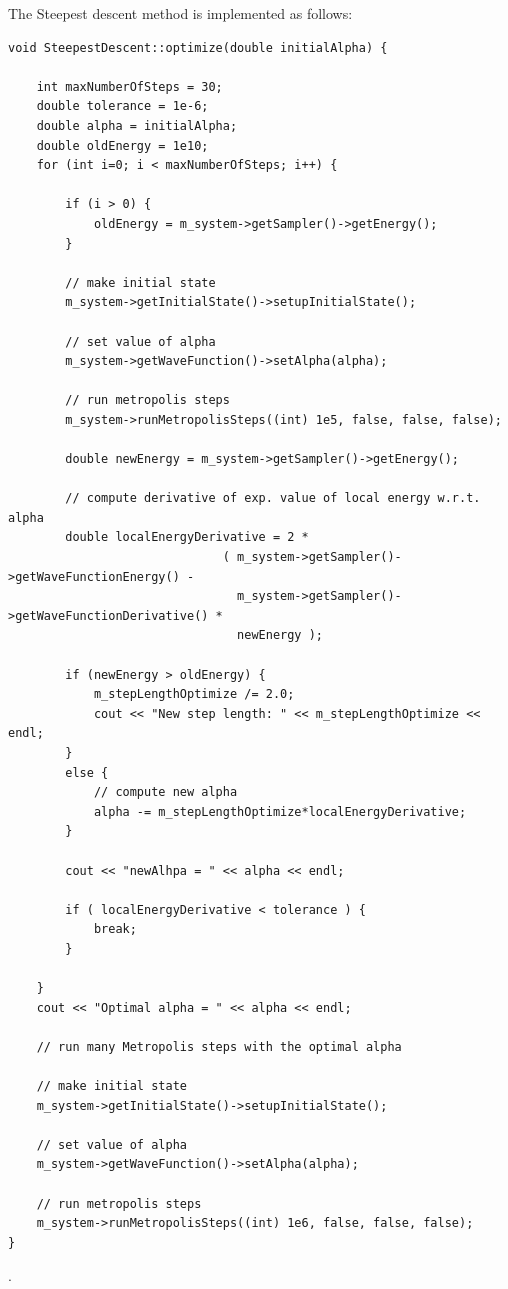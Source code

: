 \documentclass[english, a4paper]{article}
\begin{document}
\noindent The Steepest descent method is implemented as follows:
\belowcaptionskip=-10pt
\begin{lstlisting}[label=steepestdescent,caption=The Steepest Descent method]
void SteepestDescent::optimize(double initialAlpha) {

    int maxNumberOfSteps = 30;
    double tolerance = 1e-6;
    double alpha = initialAlpha;
    double oldEnergy = 1e10;
    for (int i=0; i < maxNumberOfSteps; i++) {

        if (i > 0) {
            oldEnergy = m_system->getSampler()->getEnergy();
        }

        // make initial state
        m_system->getInitialState()->setupInitialState();

        // set value of alpha
        m_system->getWaveFunction()->setAlpha(alpha);

        // run metropolis steps
        m_system->runMetropolisSteps((int) 1e5, false, false, false);

        double newEnergy = m_system->getSampler()->getEnergy();

        // compute derivative of exp. value of local energy w.r.t. alpha
        double localEnergyDerivative = 2 * 
                              ( m_system->getSampler()->getWaveFunctionEnergy() -
                                m_system->getSampler()->getWaveFunctionDerivative() *
                                newEnergy );

        if (newEnergy > oldEnergy) {
            m_stepLengthOptimize /= 2.0;
            cout << "New step length: " << m_stepLengthOptimize << endl;
        }
        else {
            // compute new alpha
            alpha -= m_stepLengthOptimize*localEnergyDerivative;
        }

        cout << "newAlhpa = " << alpha << endl;

        if ( localEnergyDerivative < tolerance ) {
            break;
        }

    }
    cout << "Optimal alpha = " << alpha << endl;

    // run many Metropolis steps with the optimal alpha

    // make initial state
    m_system->getInitialState()->setupInitialState();

    // set value of alpha
    m_system->getWaveFunction()->setAlpha(alpha);

    // run metropolis steps
    m_system->runMetropolisSteps((int) 1e6, false, false, false);
}
\end{lstlisting}
.
\end{document}
